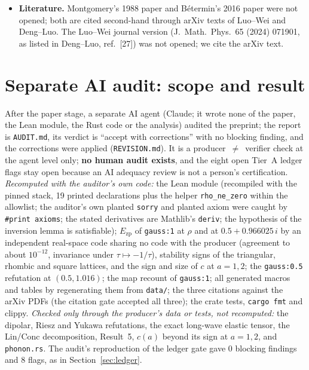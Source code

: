 \documentclass[10pt]{article}
\newcommand{\lean}[1]{\texttt{#1}}
\newcommand{\Ezp}{E_{\mathrm{zp}}}
\begin{document}
\begin{itemize}
\item \textbf{Literature.} Montgomery's 1988 paper and B\'etermin's 2016 paper were not opened; both are cited second-hand through arXiv texts of Luo--Wei and Deng--Luo. The Luo--Wei journal version (J.\ Math.\ Phys.\ 65 (2024) 071901, as listed in Deng--Luo, ref.~[27]) was not opened; we cite the arXiv text.
\end{itemize}

\section{Separate AI audit: scope and result}\label{sec:audit}
After the paper stage, a separate AI agent (Claude; it wrote none of the paper, the Lean module, the Rust code or the analysis) audited the preprint; the report is \texttt{AUDIT.md}, its verdict is ``accept with corrections'' with no blocking finding, and
the corrections were applied (\texttt{REVISION.md}). It is a producer~$\neq$~verifier check at the agent level only; \textbf{no human audit exists}, and the eight open Tier~A ledger flags stay open because an AI adequacy review is not a person's certification.
\emph{Recomputed with the auditor's own code:} the Lean module (recompiled with the pinned stack, 19 printed declarations plus the helper \lean{rho\_ne\_zero} within the allowlist; the auditor's own planted \lean{sorry} and planted axiom were caught by \lean{\#print axioms}; the stated derivatives are Mathlib's \lean{deriv}; the hypothesis of the inversion lemma is satisfiable);
$\Ezp$ of \texttt{gauss:1} at $\rho$ and at $0.5+0.966025\,i$ by an independent real-space code sharing no code with the producer (agreement to about $10^{-12}$, invariance under $\tau\mapsto-1/\tau$), stability signs of the triangular, rhombic and square lattices, and the sign and size of $c$ at $a=1,2$;
the \texttt{gauss:0.5} refutation at $(0.5,1.016)$; the map recount of \texttt{gauss:1}; all generated macros and tables by regenerating them from \texttt{data/}; the three citations against the arXiv PDFs (the citation gate accepted all three); the crate tests, \texttt{cargo fmt} and clippy.
\emph{Checked only through the producer's data or tests, not recomputed:} the dipolar, Riesz and Yukawa refutations, the exact long-wave elastic tensor, the Lin/Conc decomposition, Result~5, $c(a)$ beyond its sign at $a=1,2$, and \texttt{phonon.rs}.
The audit's reproduction of the ledger gate gave 0 blocking findings and 8 flags, as in Section~\ref{sec:ledger}.
\end{document}
